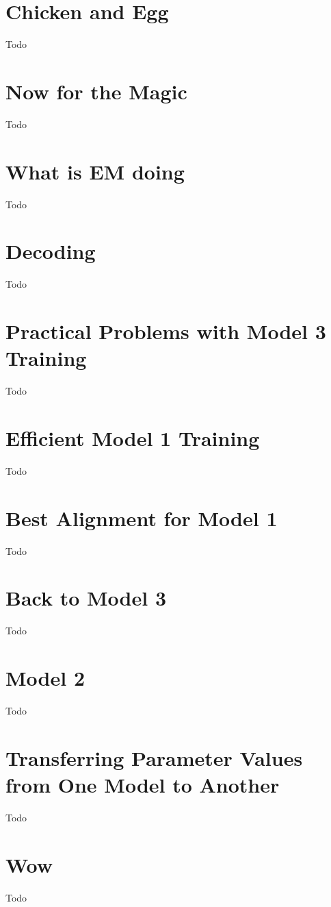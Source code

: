 \documentclass[a4paper]{article}
\begin{document}
\section{Chicken and Egg}
Todo

\section{Now for the Magic}
Todo

\section{What is EM doing}
Todo

\section{Decoding}
Todo

\section{Practical Problems with Model 3 Training}
Todo

\section{Efficient Model 1 Training}
Todo

\section{Best Alignment for Model 1}
Todo

\section{Back to Model 3}
Todo

\section{Model 2}
Todo

\section{Transferring Parameter Values from One Model to Another}
Todo

\section{Wow}
Todo
\end{document}

